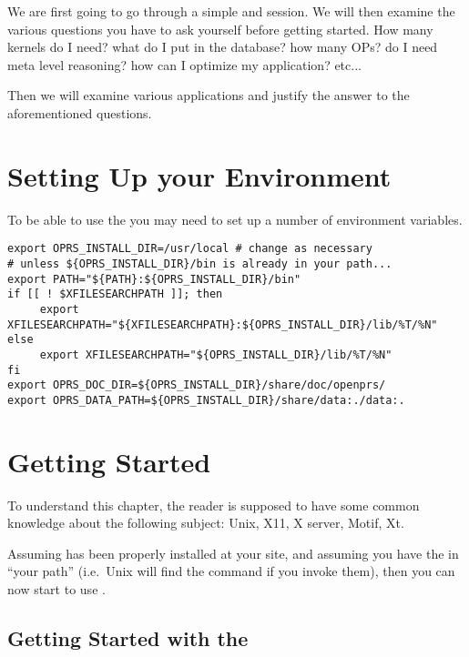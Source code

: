We are first going to go through a simple \OPE{} and \XPK{} session. We
will then  examine the various questions you have to ask
yourself before getting started. How many kernels do I need? what do I
put in the database? how many OPs? do I need meta level reasoning? how
can I optimize my application? etc...

Then we will examine various applications and justify the answer to the
aforementioned questions.

\chapter{Setting Up your Environment}

To be able to use the \COPRSDE{} you may need to set up a number of environment
variables.

\begin{verbatim}
export OPRS_INSTALL_DIR=/usr/local # change as necessary
# unless ${OPRS_INSTALL_DIR}/bin is already in your path...
export PATH="${PATH}:${OPRS_INSTALL_DIR}/bin"
if [[ ! $XFILESEARCHPATH ]]; then
     export XFILESEARCHPATH="${XFILESEARCHPATH}:${OPRS_INSTALL_DIR}/lib/%T/%N"
else
     export XFILESEARCHPATH="${OPRS_INSTALL_DIR}/lib/%T/%N"
fi
export OPRS_DOC_DIR=${OPRS_INSTALL_DIR}/share/doc/openprs/
export OPRS_DATA_PATH=${OPRS_INSTALL_DIR}/share/data:./data:.
\end{verbatim}


\chapter{Getting Started}

To understand this chapter, the reader is supposed to have some common
knowledge about the following subject: Unix, X11, X server, Motif, Xt. 

Assuming \COPRSDE{} has been properly installed at your site, and assuming
you have the \COPRSDE{} in ``your path'' (i.e.\ Unix will find the command
if you invoke them), then you can now start to use \COPRS{}.



\section{Getting Started with the \OPE{}}

